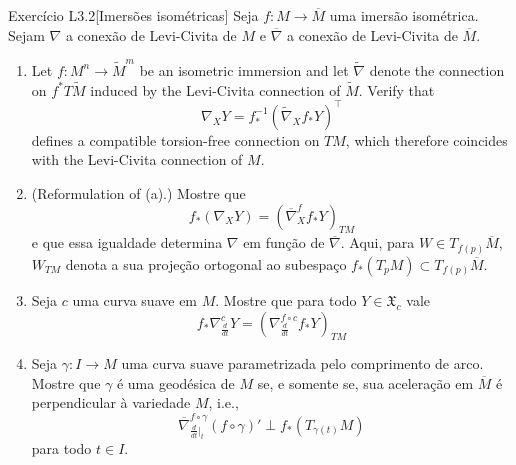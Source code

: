 \begin{thing6}{Exercício L3.2}[Imersões isométricas]\label{exer:L3.2}\leavevmode
Seja \(f:M \to \overline{M}\) uma imersão isométrica. Sejam \(\nabla\) a conexão de Levi-Civita de \(M\) e \(\overline{\nabla}\) a conexão de Levi-Civita de \(\overline{M}\).
\begin{enumerate}[label=(\alph*)]
\item Let \(f:M^n \to \widetilde{M}^m\) be an isometric immersion and let \(\widetilde{\nabla}\) denote the connection on \(f^*T \widetilde{M}\) induced by the Levi-Civita connection of \(\widetilde{M}\). Verify that
	\[\nabla_XY=f^{-1}_*\left(\widetilde{\nabla}_X f_*Y\right)^\top\]
defines a compatible torsion-free connection on \(TM\), which therefore coincides with the Levi-Civita connection of \(M\).	

\item  (Reformulation of (a).) Mostre que
	\[f_*(\nabla_XY)=\left(\overline{\nabla}^f_Xf_*Y\right)_{TM}\]
e que essa igualdade determina \(\nabla\) em função de \(\overline{\nabla}\). Aqui, para \(W \in T_{f(p)}\overline{M}\), \(W_{TM}\) denota a sua projeção ortogonal ao subespaço \(f_*(T_pM) \subset T_{f(p)}\overline{M}\).
\item Seja \(c\) uma curva suave em \(M\). Mostre que para todo \(Y \in \mathfrak{X}_c\) vale
	\[f_*\nabla^c_{\frac{d}{dt}}Y=\left(\nabla^{f \circ c}_{\frac{d}{dt}}f_*Y\right)_{TM} \]
\item Seja \(\gamma:I \to M\) uma curva suave parametrizada pelo comprimento de arco. Mostre que \(\gamma\) é uma geodésica de \(M\) se, e somente se, sua aceleração em \(\overline{M}\) é perpendicular à variedade \(M\), i.e.,
	\[\overline{\nabla}^{f \circ \gamma}_{\frac{d}{dt}\Big|_{t}}(f \circ \gamma)' \perp f_*(T_{\gamma(t)}M)\]
	para todo \(t \in I\).
\end{enumerate}
\end{thing6}

